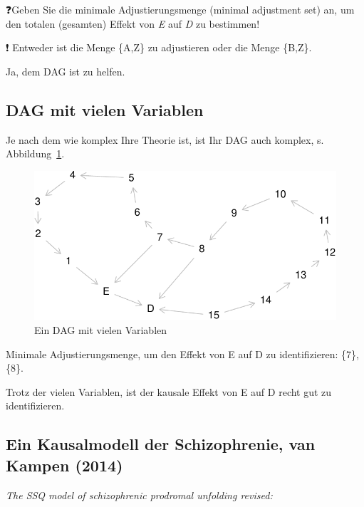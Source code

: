 \documentclass[
  a4paper,
  DIV=11]{scrreprt}
\theoremstyle{definition}
\theoremstyle{remark}
\begin{document}
❓Geben Sie die minimale Adjustierungsmenge (minimal adjustment set) an,
um den totalen (gesamten) Effekt von \emph{E} auf \emph{D} zu bestimmen!

❗ Entweder ist die Menge \{A,Z\} zu adjustieren oder die Menge \{B,Z\}.

Ja, dem DAG ist zu helfen.

\hypertarget{dag-mit-vielen-variablen}{%
\subsection{DAG mit vielen Variablen}\label{dag-mit-vielen-variablen}}

Je nach dem wie komplex Ihre Theorie ist, ist Ihr DAG auch komplex, s.
Abbildung~\ref{fig-dag-komplex}.

\begin{figure}

{\centering \includegraphics{./abschluss_files/figure-pdf/fig-dag-komplex-1.pdf}

}

\caption{\label{fig-dag-komplex}Ein DAG mit vielen Variablen}

\end{figure}

Minimale Adjustierungsmenge, um den Effekt von E auf D zu
identifizieren: \{7\}, \{8\}.

Trotz der vielen Variablen, ist der kausale Effekt von E auf D recht gut
zu identifizieren.

\hypertarget{ein-kausalmodell-der-schizophrenie-van-kampen-2014}{%
\subsection{Ein Kausalmodell der Schizophrenie, van Kampen
(2014)}\label{ein-kausalmodell-der-schizophrenie-van-kampen-2014}}

\emph{The SSQ model of schizophrenic prodromal unfolding revised:}
\end{document}
